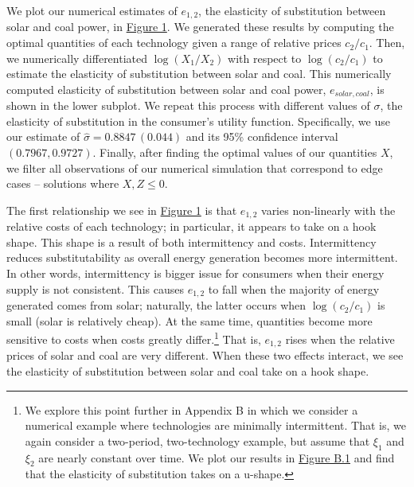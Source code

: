 \documentclass[11pt,a4paper]{extarticle}
\begin{document}
We plot our numerical estimates of $e_{1, 2}$, the elasticity of substitution between solar and coal power, in \hyperref[fig:eosnum]{Figure 1}. We generated these results by computing the optimal quantities of each technology given a range of relative prices $c_2/c_1$. Then, we numerically differentiated $\log(X_1/X_2)$ with respect to $\log(c_2/c_1)$ to estimate the elasticity of substitution between solar and coal. This numerically computed elasticity of substitution between solar and coal power, $e_{solar,coal}$, is shown in the lower subplot. We repeat this process with different values of $\sigma$, the elasticity of substitution in the consumer's utility function. Specifically, we use our estimate of $\hat{\sigma} = 0.8847\, (0.044)$ and its 95\%  confidence interval $(0.7967, 0.9727)$.  Finally, after finding the optimal values of our quantities $X$, we filter all observations of our numerical simulation that correspond to edge cases -- solutions where $X, Z \leq  0$.



The first relationship we see in \hyperref[fig:eosnum]{Figure 1} is that $e_{1,2}$ varies non-linearly with the relative costs of each technology; in particular, it appears to take on a hook shape. This shape is a result of both intermittency and costs. Intermittency reduces substitutability as overall energy generation becomes more intermittent. In other words, intermittency is bigger issue for consumers when their energy supply is not consistent. This causes $e_{1,2}$ to fall when the majority of energy generated comes from solar; naturally, the latter occurs when $\log(c_2/c_1)$ is small (solar is relatively cheap). At the same time, quantities become more sensitive to costs when costs greatly differ.\footnote{We explore this point further in Appendix B in which we consider a numerical example where technologies are minimally intermittent. That is, we again consider a two-period, two-technology example, but assume that $\xi_1$ and $\xi_2$ are nearly constant over time. We plot our results in \hyperref[fig:eosrange]{Figure B.1} and find that the elasticity of substitution takes on a u-shape. } That is, $e_{1,2}$ rises when the relative prices of solar and coal are very different. When these two effects interact, we see the elasticity of substitution between solar and coal take on a hook shape. 
\end{document}
